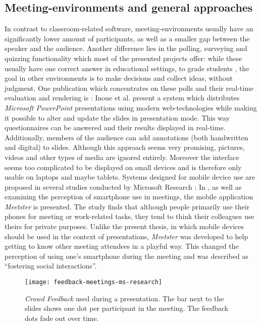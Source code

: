 \subsection{Meeting-environments and general approaches}

In contrast to classroom-related software, meeting-en\-vi\-ron\-ments usually have an significantly lower amount of participants, as well as a smaller gap between the speaker and the audience. Another difference lies in the polling, surveying and quizzing functionality which most of the presented projects offer: while these usually have one correct answer in educational settings, to grade students \cite{Lindquist:ExploringMobilePhonesActiveLearning, Triglianos:InteractiveWebPresentationsImpress, Bry:Backstage}, the goal in other environments is to make decisions and collect ideas, without judgment.
One publication which concentrates on these polls and their real-time evaluation and rendering is \cite{Inoue:RealTimeQuestionnaire}: Inoue et al. present a system which distributes \emph{Microsoft PowerPoint} presentations using modern web-technologies while making it possible to alter and update the slides in presentation mode. This way questionnaires can be answered and their results displayed in real-time. Additionally, members of the audience can add annotations (both handwritten and digital) to slides. Although this approach seems very promising, pictures, videos and other types of media are ignored entirely. Moreover the interface seems too complicated to be displayed on small devices and is therefore only usable on laptops and maybe tablets. Systems designed for mobile device use are proposed in several studies conducted by Microsoft Research \cite{Bohmer:SmartphoneUseRude,Teevan:MobileFeedbackDuringPresentation,Chattopadhyay:OfficeSocialRemoteControl}: In \cite{Bohmer:SmartphoneUseRude}, as well as examining the perception of smartphone use in meetings, the mobile application \emph{Meetster} is presented. The study finds that although people primarily use their phones for meeting or work-related tasks, they tend to think their colleagues use theirs for private purposes. Unlike the present thesis, in which mobile devices should be used in the context of presentations, \emph{Meetster} was developed to help getting to know other meeting attendees in a playful way. This changed the perception of using one's smartphone during the meeting and was described as ``fostering social interactions''.

\begin{figure}
\centering
\texttt{[image: feedback-meetings-ms-research]}
\caption{\emph{Crowd Feedback} \cite{Teevan:MobileFeedbackDuringPresentation} used during a presentation. The bar next to the slides shows one dot per participant in the meeting. The feedback dots fade out over time.}
\label{fig:related-work-crowd-feedback}
\end{figure}

